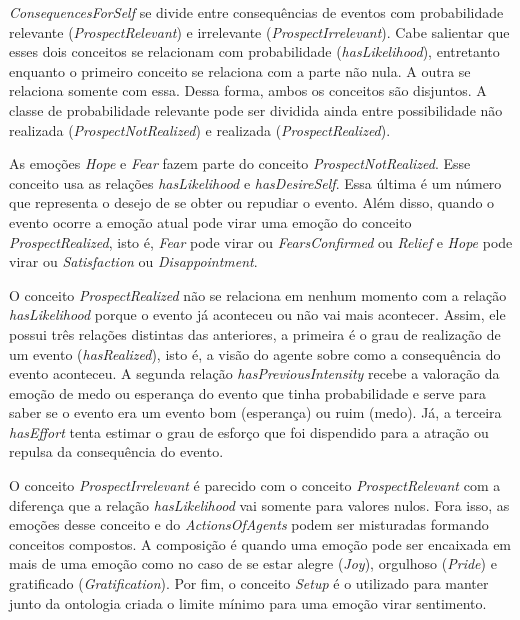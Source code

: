 \emph{ConsequencesForSelf} se divide entre consequências de eventos com
probabilidade relevante (\emph{ProspectRelevant}) e irrelevante
(\emph{ProspectIrrelevant}). Cabe salientar que esses dois conceitos se
relacionam com probabilidade (\emph{hasLikelihood}), entretanto enquanto o
primeiro conceito se relaciona com a parte não nula. A outra se relaciona
somente com essa. Dessa forma, ambos os conceitos são disjuntos. A classe de
probabilidade relevante pode ser dividida ainda entre possibilidade não
realizada (\emph{ProspectNotRealized}) e realizada (\emph{ProspectRealized}).

As emoções \emph{Hope} e \emph{Fear} fazem parte do conceito
\emph{ProspectNotRealized}. Esse conceito usa as relações \emph{hasLikelihood}
e \emph{hasDesireSelf}. Essa última é um número que
representa o desejo de se obter ou repudiar o evento. Além disso, quando o
evento ocorre a emoção atual pode virar uma emoção do conceito
\emph{ProspectRealized}, isto é, \emph{Fear} pode virar ou
\emph{FearsConfirmed} ou \emph{Relief} e \emph{Hope} pode virar ou
\emph{Satisfaction} ou \emph{Disappointment}.

O conceito \emph{ProspectRealized} não se relaciona em nenhum momento com a
relação \emph{hasLikelihood} porque o evento já aconteceu ou não vai mais
acontecer. Assim, ele possui três relações distintas das anteriores, a
primeira é o grau de realização de um evento (\emph{hasRealized}), isto é, a
visão do agente sobre como a consequência do evento aconteceu. A segunda
relação \emph{hasPreviousIntensity} recebe a valoração da emoção de medo ou
esperança do evento que tinha probabilidade e serve para saber se o evento era
um evento bom (esperança) ou ruim (medo). Já, a terceira \emph{hasEffort}
tenta estimar o grau de esforço que foi dispendido para a atração ou repulsa
da consequência do evento.

O conceito \emph{ProspectIrrelevant} é parecido com o conceito
\emph{ProspectRelevant} com a diferença que a relação \emph{hasLikelihood} vai
somente para valores nulos. Fora isso, as emoções desse conceito e do
\emph{ActionsOfAgents} podem ser misturadas formando conceitos compostos.
A composição é quando uma emoção pode ser encaixada em mais de uma emoção
como no caso de se estar alegre (\emph{Joy}), orgulhoso (\emph{Pride}) e
gratificado (\emph{Gratification}). Por fim, o conceito \emph{Setup}
é o utilizado para manter junto da ontologia criada o limite mínimo para uma
emoção virar sentimento\dev{}.


